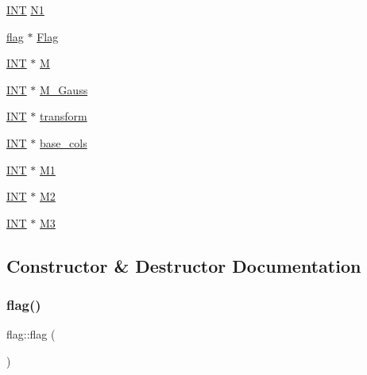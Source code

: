 \begin{DoxyCompactItemize}
\item 
\mbox{\hyperlink{galois_8h_a09fddde158a3a20bd2dcadb609de11dc}{I\+NT}} \mbox{\hyperlink{classflag_a565adb9c8ac7af2d18778ba9d6aefe93}{N1}}
\item 
\mbox{\hyperlink{classflag}{flag}} $\ast$ \mbox{\hyperlink{classflag_a495b6bcb56dbf03fbb9d1b33c4e8750b}{Flag}}
\item 
\mbox{\hyperlink{galois_8h_a09fddde158a3a20bd2dcadb609de11dc}{I\+NT}} $\ast$ \mbox{\hyperlink{classflag_aa7bf71bd2ee46f3d7dc73a60fafa2124}{M}}
\item 
\mbox{\hyperlink{galois_8h_a09fddde158a3a20bd2dcadb609de11dc}{I\+NT}} $\ast$ \mbox{\hyperlink{classflag_a0bb5964e9dc454182923497717c7fd60}{M\+\_\+\+Gauss}}
\item 
\mbox{\hyperlink{galois_8h_a09fddde158a3a20bd2dcadb609de11dc}{I\+NT}} $\ast$ \mbox{\hyperlink{classflag_a8223a19b861de85af1e99de60e2025cd}{transform}}
\item 
\mbox{\hyperlink{galois_8h_a09fddde158a3a20bd2dcadb609de11dc}{I\+NT}} $\ast$ \mbox{\hyperlink{classflag_a2078dba7382037bf731a88092d1b1c54}{base\+\_\+cols}}
\item 
\mbox{\hyperlink{galois_8h_a09fddde158a3a20bd2dcadb609de11dc}{I\+NT}} $\ast$ \mbox{\hyperlink{classflag_a2716b125596580d62af6a5856ab7c74b}{M1}}
\item 
\mbox{\hyperlink{galois_8h_a09fddde158a3a20bd2dcadb609de11dc}{I\+NT}} $\ast$ \mbox{\hyperlink{classflag_aa24cee06678b3c6f0c96884486aeb594}{M2}}
\item 
\mbox{\hyperlink{galois_8h_a09fddde158a3a20bd2dcadb609de11dc}{I\+NT}} $\ast$ \mbox{\hyperlink{classflag_a4bf86111a8a6c9b20b23f288bc01ce19}{M3}}
\end{DoxyCompactItemize}


\subsection{Constructor \& Destructor Documentation}
\mbox{\label{classflag_a5b95682242e4c94655ee217be26e20d2}} 
\subsubsection{\texorpdfstring{flag()}{flag()}}
{\footnotesize\ttfamily flag\+::flag (\begin{DoxyParamCaption}{ }\end{DoxyParamCaption})}

